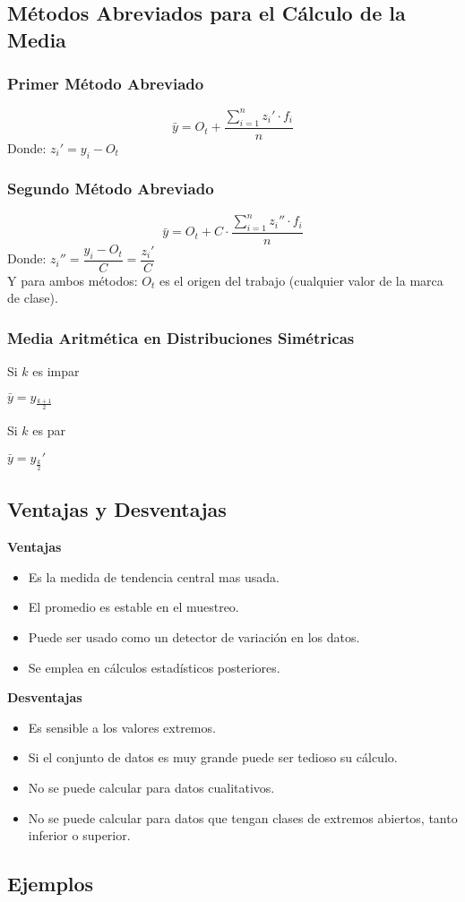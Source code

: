 \subsection{Métodos Abreviados para el Cálculo de la Media}
\subsubsection{Primer Método Abreviado}
$$\bar{y}=O_t + \dfrac{\displaystyle\sum_{i=1}^{n}z_i'\cdot f_i}{n}$$
Donde: $z_i'=y_i - O_t$
\subsubsection{Segundo Método Abreviado}
$$\bar{y}=O_t + C\cdot \dfrac{\displaystyle\sum_{i=1}^{n}z_i''\cdot f_i}{n}$$
Donde: $z_i''=\dfrac{y_i - O_t}{C}=\dfrac{z_i'}{C}$\\${ }$\\
Y para ambos métodos: $O_t$ es el origen del trabajo (cualquier valor de la marca de clase).
\subsubsection{Media Aritmética en Distribuciones Simétricas}
\begin{multicols}{2}
Si $k$ es impar
\begin{center}
$\bar{y}=y_{\frac{k+1}{2}}$
\end{center}
\columnbreak
Si $k$ es par
\begin{center}
$\bar{y}=y_{\frac{k}{2}}'$
\end{center}
\end{multicols}
\subsection{Ventajas y Desventajas}
\begin{multicols}{2}
\textbf{Ventajas}
\begin{itemize}
\item Es la medida de tendencia central mas usada.
\item El promedio es estable en el muestreo.
\item Puede ser usado como un detector de variación en los datos.
\item Se emplea en cálculos estadísticos posteriores.
\end{itemize}
\columnbreak
\textbf{Desventajas}
\begin{itemize}
\item Es sensible a los valores extremos.
\item Si el conjunto de datos es muy grande puede ser tedioso su cálculo.
\item No se puede calcular para datos cualitativos.
\item No se puede calcular para datos que tengan clases de extremos abiertos, tanto inferior o superior.
\end{itemize}
\end{multicols}
\subsection{Ejemplos}